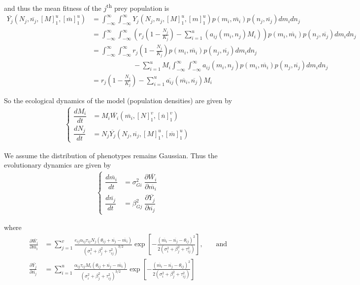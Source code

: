 \documentclass[12pt]{article}
\begin{document}
\noindent and thus the mean fitness of the $j$\textsuperscript{th} prey population is
\begin{align*}
	\overline{Y_j}(N_j, \overline{n_j}, [M]_1^u, [\overline{m}]_1^u) &= \int_{-\infty}^{\infty}\int_{-\infty}^{\infty} Y_j(N_j, n_j, [M]_1^u, [m]_1^u) p(m_i, \overline{m_i}) p(n_j, \overline{n_j}) dm_i dn_j \\
	&= \int_{-\infty}^{\infty}\int_{-\infty}^{\infty} \left(r_j\left(1 - \frac{N_j}{K_j} \right) - \sum_{i = 1}^u\left(a_{ij}(m_i, n_j)M_i\right)\right) p(m_i, \overline{m_i}) p(n_j, \overline{n_j}) dm_i dn_j \\
	&= \int_{-\infty}^{\infty}\int_{-\infty}^{\infty} r_j\left(1 - \frac{N_j}{K_j} \right) p(m_i, \overline{m_i}) p(n_j, \overline{n_j}) dm_i dn_j \\
	&\qquad\qquad\qquad - \sum_{i = 1}^u M_i \int_{-\infty}^{\infty}\int_{-\infty}^{\infty} a_{ij}(m_i, n_j) p(m_i, \overline{m_i}) p(n_j, \overline{n_j}) dm_i dn_j \\
	&= r_j \left(1 - \frac{N_j}{K_j} \right) - \sum_{i = 1}^u \overline{a_{ij}}(\overline{m_i}, \overline{n_j}) M_i
\end{align*}

\noindent So the ecological dynamics of the model (population densities) are given by
\begin{align}
	\begin{cases}
		\dfrac{dM_i}{dt} &= M_i \overline{W_i}(\overline{m_i}, [N]_1^v, [\overline{n}]_1^v) \\[.25cm]
		\dfrac{dN_j}{dt} &= N_j \overline{Y_j}(N_j, \overline{n_j}, [M]_1^u, [\overline{m}]_1^u)
	\end{cases}
\end{align}

\noindent We assume the distribution of phenotypes remains Gaussian.  Thus the evolutionary dynamics are given by
\begin{align}
	\begin{cases}
		\dfrac{d\overline{m_i}}{dt} &= \sigma_{Gi}^2 \; \dfrac{\partial \overline{W_i}}{\partial \overline{m_i}} \\[.25cm]
		\dfrac{d\overline{n_j}}{dt} &= \beta_{Gj}^2 \; \dfrac{\partial \overline{Y_j}}{\partial \overline{n_j}}
	\end{cases}
\end{align}

\noindent where
\begin{align*}
	\frac{\partial \overline{W_i}}{\partial \overline{m_i}} &= \sum_{j=1}^v\frac{e_{ij}\alpha_{ij}\tau_{ij}N_j(\theta_{ij} + \overline{n_j} - \overline{m_i})}{(\sigma_i^2 + \beta_j^2 + \tau_{ij}^2)^{3/2}} \exp\left[{-\frac{(\overline{m_i} - \overline{n_j} - \theta_{ij})^2}{2(\sigma_i^2 + \beta_j^2 + \tau_{ij}^2)}}\right]\text{,} \qquad\text{and} \\
	\frac{\partial \overline{Y_j}}{\partial \overline{n_j}} &= \sum_{i=1}^u\frac{\alpha_{ij}\tau_{ij}M_i(\theta_{ij} + \overline{n_j} - \overline{m_i})}{(\sigma_i^2 + \beta_j^2 + \tau_{ij}^2)^{3/2}} \exp\left[{-\frac{(\overline{m_i} - \overline{n_j} - \theta_{ij})^2}{2(\sigma_i^2 + \beta_j^2 + \tau_{ij}^2)}}\right]
\end{align*}
\end{document}
